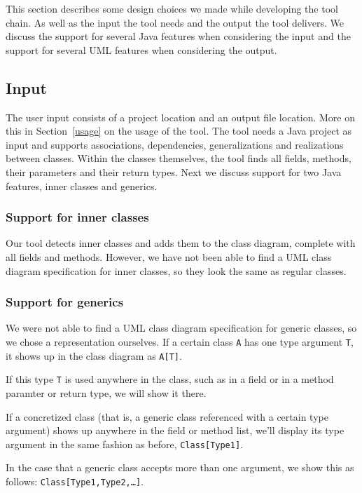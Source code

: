 This section describes some design choices we made while developing the tool chain. 
As well as the input the tool needs and the output the tool delivers. 
We discuss the support for several Java features when considering the input and the support for several UML features when considering the output.

\subsection{Input}
	The user input consists of a project location and an output file location. 
	More on this in Section~\ref{usage} on the usage of the tool.
	The tool needs a Java project as input and supports associations, dependencies, generalizations and realizations between classes. 
	Within the classes themselves, the tool finds all fields, methods, their parameters and their return types.	
	Next we discuss support for two Java features, inner classes and generics.

	\subsubsection{Support for inner classes}
		Our tool detects inner classes and adds them to the class diagram, complete with all fields and methods. 
		However, we have not been able to find a UML class diagram specification for inner classes, so they look the same as regular classes.
		
	\subsubsection{Support for generics}
		We were not able to find a UML class diagram specification for generic classes, so we chose a representation ourselves.
		If a certain class \texttt{A} has one type argument \texttt{T}, it shows up in the class diagram as \texttt{A[T]}.
		
		If this type \texttt{T} is used anywhere in the class, such as in a field or in a method paramter or return type, we will show it there.
		
		If a concretized class (that is, a generic class referenced with a certain type argument) shows up anywhere in the field or method list, we'll display its type argument in the same fashion as before, \texttt{Class[Type1]}.
		
		In the case that a generic class accepts more than one argument, we show this as follows: \texttt{Class[Type1,Type2,\ldots]}.

